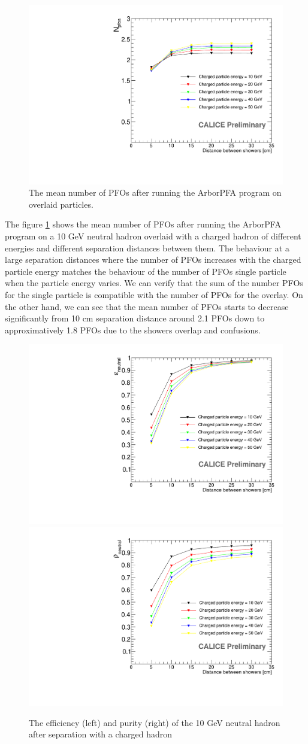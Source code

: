 \documentclass[cits]{JINST}
\begin{document}
\begin{figure}[!h]
  \begin{center}
    \includegraphics[width=0.6\linewidth]{plots/OverlayEvent_NPfos.pdf}
  \end{center}
  \caption{\label{OVERLAY_EVENT_NPFOS} The mean number of PFOs after running the ArborPFA program on overlaid particles.}
\end{figure}


The figure \ref{OVERLAY_EVENT_NPFOS} shows the mean number of PFOs after running the ArborPFA program on a 10 GeV neutral hadron overlaid with a charged hadron of different energies and different separation distances between them. The behaviour at a large separation distances where the number of PFOs increases with the charged particle energy matches the behaviour of the number of PFOs single particle when the particle energy varies. We can verify that the sum of the number PFOs for the single particle is compatible with the number of PFOs for the overlay. On the other hand, we can see that the mean number of PFOs starts to decrease significantly from 10 cm separation distance around 2.1 PFOs down to approximatively 1.8 PFOs due to the showers overlap and confusions.

\begin{figure}[!h]
  \begin{center}
    \includegraphics[width=0.47\linewidth]{plots/OverlayEvent_NeutralEfficiency.pdf}
    \includegraphics[width=0.47\linewidth]{plots/OverlayEvent_NeutralPurity.pdf}
  \end{center}
  \caption{\label{OVERLAY_EVENT_PURITY_EFFICIENCY} The efficiency (left) and purity (right) of the 10 GeV neutral hadron after separation with a charged hadron}
\end{figure}
\end{document}
